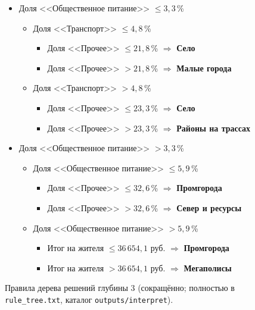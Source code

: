 \documentclass[11pt,a4paper]{article}
\newcommand{\rub}{руб.}
\begin{document}
\begin{figure}[htbp]
\centering
\small
\begin{minipage}{0.9\textwidth}
\begin{itemize}[label={},leftmargin=0pt,itemsep=1pt]
\item Доля <<Общественное питание>> $\le 3{,}3$\,\%
  \begin{itemize}[label={},leftmargin=1.2em,itemsep=1pt,topsep=1pt]
  \item Доля <<Транспорт>> $\le 4{,}8$\,\%
    \begin{itemize}[label={},leftmargin=1.2em,itemsep=1pt,topsep=1pt]
    \item Доля <<Прочее>> $\le 21{,}8$\,\% $\Rightarrow$ \textbf{Село}
    \item Доля <<Прочее>> $> 21{,}8$\,\% $\Rightarrow$ \textbf{Малые города}
    \end{itemize}
  \item Доля <<Транспорт>> $> 4{,}8$\,\%
    \begin{itemize}[label={},leftmargin=1.2em,itemsep=1pt,topsep=1pt]
    \item Доля <<Прочее>> $\le 23{,}3$\,\% $\Rightarrow$ \textbf{Село}
    \item Доля <<Прочее>> $> 23{,}3$\,\% $\Rightarrow$ \textbf{Районы на трассах}
    \end{itemize}
  \end{itemize}
\item Доля <<Общественное питание>> $> 3{,}3$\,\%
  \begin{itemize}[label={},leftmargin=1.2em,itemsep=1pt,topsep=1pt]
  \item Доля <<Общественное питание>> $\le 5{,}9$\,\%
    \begin{itemize}[label={},leftmargin=1.2em,itemsep=1pt,topsep=1pt]
    \item Доля <<Прочее>> $\le 32{,}6$\,\% $\Rightarrow$ \textbf{Промгорода}
    \item Доля <<Прочее>> $> 32{,}6$\,\% $\Rightarrow$ \textbf{Север и ресурсы}
    \end{itemize}
  \item Доля <<Общественное питание>> $> 5{,}9$\,\%
    \begin{itemize}[label={},leftmargin=1.2em,itemsep=1pt,topsep=1pt]
    \item Итог на жителя $\le 36\,654{,}1$ \rub{} $\Rightarrow$ \textbf{Промгорода}
    \item Итог на жителя $> 36\,654{,}1$ \rub{} $\Rightarrow$ \textbf{Мегаполисы}
    \end{itemize}
  \end{itemize}
\end{itemize}
\end{minipage}
\caption{Правила дерева решений глубины 3 (сокращённо; полностью в \texttt{rule\_tree.txt}, каталог \texttt{outputs/interpret}).}
\label{fig:tree}
\end{figure}
\end{document}
